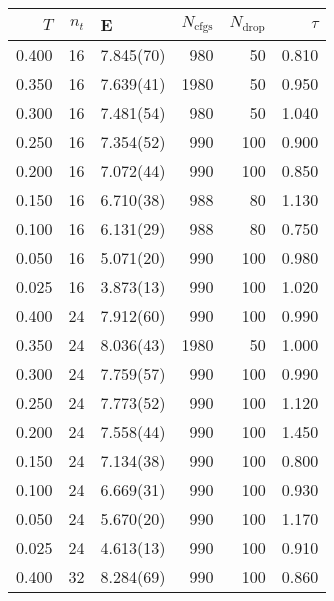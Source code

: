 \begin{tabular}{rrlrrr}
\hline
   $T$ &   $n_t$ & E         &   $N_\textrm{cfgs}$ &   $N_\textrm{drop}$ &   $\tau$ \\
\hline
 0.400 &      16 & 7.845(70) &                 980 &                  50 &    0.810 \\
 0.350 &      16 & 7.639(41) &                1980 &                  50 &    0.950 \\
 0.300 &      16 & 7.481(54) &                 980 &                  50 &    1.040 \\
 0.250 &      16 & 7.354(52) &                 990 &                 100 &    0.900 \\
 0.200 &      16 & 7.072(44) &                 990 &                 100 &    0.850 \\
 0.150 &      16 & 6.710(38) &                 988 &                  80 &    1.130 \\
 0.100 &      16 & 6.131(29) &                 988 &                  80 &    0.750 \\
 0.050 &      16 & 5.071(20) &                 990 &                 100 &    0.980 \\
 0.025 &      16 & 3.873(13) &                 990 &                 100 &    1.020 \\
 0.400 &      24 & 7.912(60) &                 990 &                 100 &    0.990 \\
 0.350 &      24 & 8.036(43) &                1980 &                  50 &    1.000 \\
 0.300 &      24 & 7.759(57) &                 990 &                 100 &    0.990 \\
 0.250 &      24 & 7.773(52) &                 990 &                 100 &    1.120 \\
 0.200 &      24 & 7.558(44) &                 990 &                 100 &    1.450 \\
 0.150 &      24 & 7.134(38) &                 990 &                 100 &    0.800 \\
 0.100 &      24 & 6.669(31) &                 990 &                 100 &    0.930 \\
 0.050 &      24 & 5.670(20) &                 990 &                 100 &    1.170 \\
 0.025 &      24 & 4.613(13) &                 990 &                 100 &    0.910 \\
 0.400 &      32 & 8.284(69) &                 990 &                 100 &    0.860 \\

\end{tabular}
